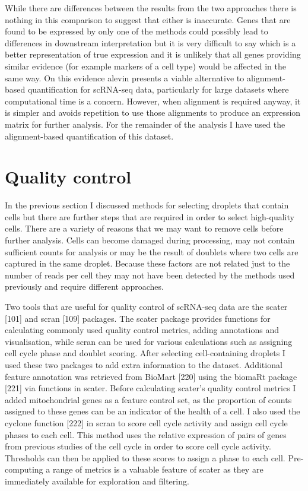 \documentclass[11pt,a4paper,titlepage,twoside,openright]{style/unimelbthesis}
\theoremstyle{definition}
\theoremstyle{definition}
\theoremstyle{definition}
\theoremstyle{remark}
\begin{document}
\begin{mainmatter}
While there are differences between the results from the two approaches there is nothing in this comparison to suggest that either is inaccurate. Genes that are found to be expressed by only one of the methods could possibly lead to differences in downstream interpretation but it is very difficult to say which is a better representation of true expression and it is unlikely that all genes providing similar evidence (for example markers of a cell type) would be affected in the same way. On this evidence alevin presents a viable alternative to alignment-based quantification for scRNA-seq data, particularly for large datasets where computational time is a concern. However, when alignment is required anyway, it is simpler and avoids repetition to use those alignments to produce an expression matrix for further analysis. For the remainder of the analysis I have used the alignment-based quantification of this dataset.

\hypertarget{quality-control}{%
\section{Quality control}\label{quality-control}}

In the previous section I discussed methods for selecting droplets that contain cells but there are further steps that are required in order to select high-quality cells. There are a variety of reasons that we may want to remove cells before further analysis. Cells can become damaged during processing, may not contain sufficient counts for analysis or may be the result of doublets where two cells are captured in the same droplet. Because these factors are not related just to the number of reads per cell they may not have been detected by the methods used previously and require different approaches.

Two tools that are useful for quality control of scRNA-seq data are the scater {[}101{]} and scran {[}109{]} packages. The scater package provides functions for calculating commonly used quality control metrics, adding annotations and visualisation, while scran can be used for various calculations such as assigning cell cycle phase and doublet scoring. After selecting cell-containing droplets I used these two packages to add extra information to the dataset. Additional feature annotation was retrieved from BioMart {[}220{]} using the biomaRt package {[}221{]} via functions in scater. Before calculating scater's quality control metrics I added mitochondrial genes as a feature control set, as the proportion of counts assigned to these genes can be an indicator of the health of a cell. I also used the cyclone function {[}222{]} in scran to score cell cycle activity and assign cell cycle phases to each cell. This method uses the relative expression of pairs of genes from previous studies of the cell cycle in order to score cell cycle activity. Thresholds can then be applied to these scores to assign a phase to each cell. Pre-computing a range of metrics is a valuable feature of scater as they are immediately available for exploration and filtering.


\end{mainmatter}
\end{document}

